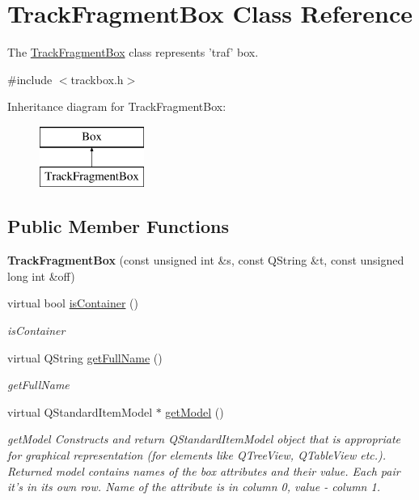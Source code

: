 \hypertarget{class_track_fragment_box}{\section{Track\-Fragment\-Box Class Reference}
\label{class_track_fragment_box}
}


The \hyperlink{class_track_fragment_box}{Track\-Fragment\-Box} class represents 'traf' box.  




{\ttfamily \#include $<$trackbox.\-h$>$}

Inheritance diagram for Track\-Fragment\-Box\-:\begin{figure}[H]
\begin{center}
\leavevmode
\includegraphics[height=2.000000cm]{class_track_fragment_box}
\end{center}
\end{figure}
\subsection*{Public Member Functions}
\begin{DoxyCompactItemize}
\item 
\hypertarget{class_track_fragment_box_ae6ccdc27446abd4b817ce4424aab314e}{{\bfseries Track\-Fragment\-Box} (const unsigned int \&s, const Q\-String \&t, const unsigned long int \&off)}\label{class_track_fragment_box_ae6ccdc27446abd4b817ce4424aab314e}

\item 
virtual bool \hyperlink{class_track_fragment_box_a49538cd7fe1c888203eab7cee5cfb08c}{is\-Container} ()
\begin{DoxyCompactList}\small\item\em is\-Container \end{DoxyCompactList}\item 
virtual Q\-String \hyperlink{class_track_fragment_box_a1ab269642f375777c20b9ab52fbc72f7}{get\-Full\-Name} ()
\begin{DoxyCompactList}\small\item\em get\-Full\-Name \end{DoxyCompactList}\item 
virtual Q\-Standard\-Item\-Model $\ast$ \hyperlink{class_track_fragment_box_a0a177d42598a374f5d187a3f968aeb01}{get\-Model} ()
\begin{DoxyCompactList}\small\item\em get\-Model Constructs and return Q\-Standard\-Item\-Model object that is appropriate for graphical representation (for elements like Q\-Tree\-View, Q\-Table\-View etc.). Returned model contains names of the box attributes and their value. Each pair it's in its own row. Name of the attribute is in column 0, value -\/ column 1. \end{DoxyCompactList}\end{DoxyCompactItemize}
